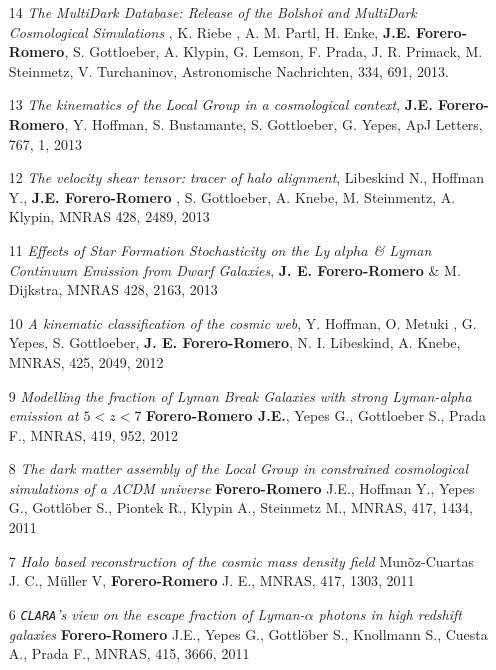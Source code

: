 \documentclass[letterpaper,11pt,onecolumn]{article}
\begin{document}
\begin{enumerate}
\item[14]{\it The MultiDark Database: Release of the Bolshoi and
  MultiDark Cosmological Simulations} , K. Riebe , A. M. Partl,
  H. Enke, {\bf J.E. Forero-Romero}, S. Gottloeber, A. Klypin,
  G. Lemson, F. Prada, J. R. Primack, M. Steinmetz, V. Turchaninov,
  Astronomische Nachrichten, 334, 691, 2013. 

\item[13] {\it The kinematics of the Local Group in a cosmological context}, 
{\bf J.E. Forero-Romero}, Y. Hoffman, S. Bustamante, S. Gottloeber,
G. Yepes, ApJ Letters, 767, 1, 2013 


\item[12] {\it The velocity shear tensor: tracer of halo alignment},
  Libeskind N., Hoffman Y., {\bf J.E. Forero-Romero} , S. Gottloeber,
  A. Knebe, M. Steinmentz, A. Klypin, MNRAS 428, 2489, 2013 

\item[11] {\it Effects of Star Formation Stochasticity on the Ly
  $alpha$ \& Lyman Continuum Emission from Dwarf Galaxies}, {\bf
  J. E. Forero-Romero} \& M. Dijkstra, MNRAS 428, 2163, 2013 

\item[10] {\it A kinematic classification of the cosmic web},
  Y. Hoffman, O. Metuki , G. Yepes, S. Gottloeber, {\bf
    J. E. Forero-Romero}, N. I. Libeskind, A. Knebe, MNRAS, 425, 2049,
  2012 

\item[9] {\it Modelling the fraction of Lyman Break Galaxies with
  strong Lyman-alpha emission at $5 < z < 7$} {\bf Forero-Romero
  J.E.}, Yepes G., Gottloeber S., Prada F., MNRAS, 419, 952, 2012 

\item [8]
{\it The dark matter assembly of the Local Group in constrained cosmological
  simulations of a $\Lambda$CDM universe} {\bf Forero-Romero} J.E.,
Hoffman Y., Yepes G., Gottl\"ober S., Piontek R., Klypin A., Steinmetz
M.,  MNRAS, 417, 1434, 2011 

\item[7] 
{\it Halo based reconstruction of the cosmic mass density field}
Mun\~oz-Cuartas J. C., M\"uller V, {\bf Forero-Romero} J. E.,
MNRAS, 417, 1303, 2011 
 
\item [6]
{\it {\tt CLARA}'s view on the escape fraction of Lyman-$\alpha$ photons in
  high redshift galaxies}
{\bf Forero-Romero} J.E., Yepes G., Gottl\"ober S., Knollmann S., Cuesta A., Prada F.,  
MNRAS, 415, 3666, 2011


\end{enumerate}
\end{document}
